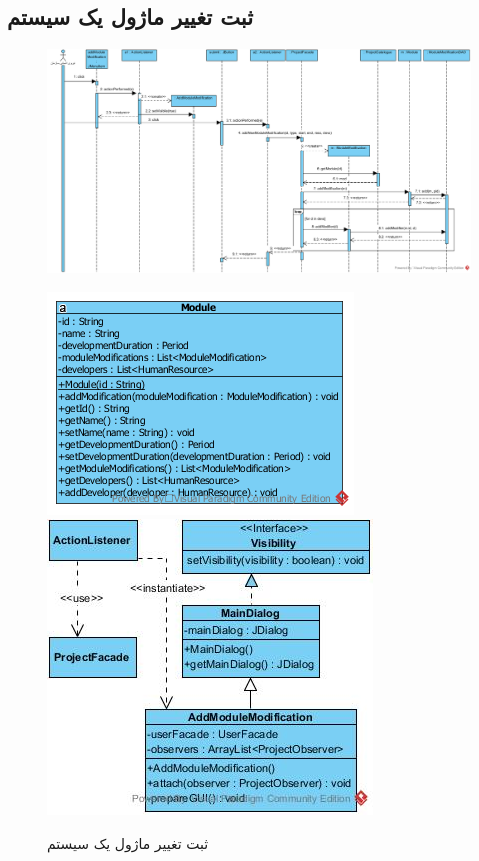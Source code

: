 \begin{landscape}
\newpage
\section{ثبت تغییر ماژول یک سیستم}
\begin{figure}[H]
	\centering
	\includegraphics[scale=0.5]{img/sequence-design/AddModuleModification}	
\end{figure}
\begin{figure}[H]
	\centering
	\includegraphics[scale=0.4]{img/sequence-design/AddModuleModificationC}
	\includegraphics[scale=0.5]{img/sequence-design/AddModuleModificationUI}
	\caption{ثبت تغییر ماژول یک سیستم}
\end{figure}


\end{landscape}
